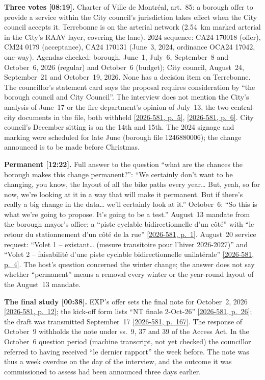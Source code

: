 \documentclass[11pt,letterpaper]{article}
\newcommand{\pagesurl}{https://openmobilitydata.github.io/Terrebonne-access-requests}
\newcommand{\cliptime}[1]{\textsf{\small[#1]}}
\newcommand{\pgl}[2]{\href{\pagesurl/2026-581/raw/01_emails_mandate_counts.pdf\#page=#1}{\textsf{\small[2026-581, p.~#2]}}}
\newcommand{\pg}[1]{\pgl{#1}{#1}}
\begin{document}
\textbf{Three votes \cliptime{08:19}.} Charter of Ville de Montréal,
art.~85: a borough offer to provide a service within the City council's
jurisdiction takes effect when the City council accepts it. Terrebonne is
on the arterial network (2.54~km marked arterial in the City's RAAV layer,
covering the lane). 2024 sequence: CA24 170018 (offer), CM24 0179
(acceptance), CA24 170131 (June~3, 2024, ordinance OCA24 17042, one-way).
Agendas checked: borough, June~1, July~6, September~8 and October~6, 2026
(regular) and October~6 (budget); City council, August~24, September~21
and October~19, 2026. None has a decision item on Terrebonne. The
councillor's statement card says the proposal requires consideration by
``the borough council and City Council''. The interview does not mention
the City's analysis of June~17 or the fire department's opinion of
July~13, the two central-city documents in the file, both withheld
\pg{5}, \pg{6}. City council's December sitting is on the 14th and 15th.
The 2024 signage and marking were scheduled for late June (borough file
1246880006); the change announced is to be made before Christmas.

\textbf{Permanent \cliptime{12:22}.} Full answer to the question ``what are
the chances the borough makes this change permanent?'': ``We certainly don't
want to be changing, you know, the layout of all the bike paths every year…
But, yeah, so for now, we're looking at it in a way that will make it
permanent. But if there's really a big change in the data… we'll certainly
look at it.'' October~6: ``So this is what we're going to propose. It's
going to be a test.'' August~13 mandate from the borough mayor's office: a
``piste cyclable bidirectionnelle d'un côté'' with ``le retour du
stationnement d'un côté de la rue'' \pg{1}. August~20 service request:
``Volet 1 -- existant… (mesure transitoire pour l'hiver 2026-2027)'' and
``Volet 2 -- faisabilité d'une piste cyclable bidirectionnelle
unilatérale'' \pg{4}. The host's question concerned the winter change; the
answer does not say whether ``permanent'' means a removal every winter or
the year-round layout of the August~13 mandate.

\textbf{The final study \cliptime{00:38}.} EXP's offer sets the final note
for October~2, 2026 \pg{12}; the kick-off form lists ``NT finale
2-Oct-26'' \pg{26}; the draft was transmitted September~17 \pg{167}. The
response of October~9 withholds the note under ss.~9, 37 and 39 of the
Access Act. In the October~6 question period (machine transcript, not yet
checked) the councillor referred to having received ``le dernier rapport''
the week before. The note was thus a week overdue on the day of the
interview, and the outcome it was commissioned to assess had been
announced three days earlier.
\end{document}

